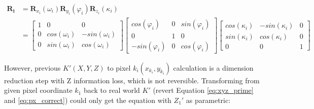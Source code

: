 \documentclass{configs/bmcart}
\begin{document}
\begin{align}
  \mathbf{R_i} & = \mathbf{R}_{x_i}(\omega_i) \mathbf{R}_{y_i}(\varphi_i) \mathbf{R}_{z_i}(\kappa_i) \nonumber\\
  & =
    \left[ 
      \begin{matrix} 
        1 & 0             & 0 \\
        0 & cos(\omega_i) & -sin(\omega_i) \\
        0 & sin(\omega_i) & cos(\omega_i)
      \end{matrix} 
    \right] 
    \left[ 
      \begin{matrix} 
        cos(\varphi_i)  & 0 & sin(\varphi_i) \\
        0               & 1 & 0 \\
        -sin(\varphi_i) & 0 & cos(\varphi_i)
      \end{matrix} 
    \right] 
    \left[ 
      \begin{matrix} 
        cos(\kappa_i) & -sin(\kappa_i) & 0 \\
        sin(\kappa_i) & cos(\kappa_i)  & 0 \\
        0             & 0              & 1
      \end{matrix} 
    \right] \nonumber %
\end{align}

However, previous $K' (X, Y, Z)$ to pixel $k_i (x_{k_i}, y_{k_i})$ calculation is a dimension reduction step with Z information loss, which is not reversible. Transforming from given pixel coordinate $k_1$ back to real world $K'$ (revert Equation \ref{eq:xyz_prime} and \ref{eq:px_correct}) could only get the equation with $Z_1'$ as parametric:
\end{document}
